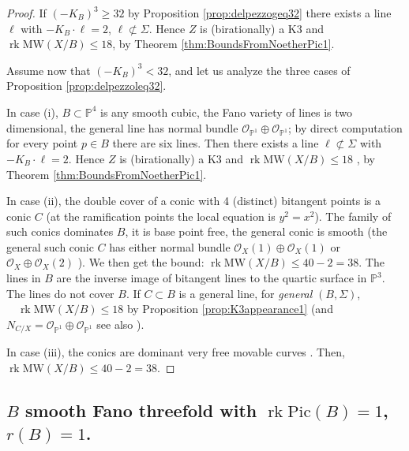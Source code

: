 \documentclass[11pt]{amsart}
\theoremstyle{definition}
\theoremstyle{definition}
\theoremstyle{remark}
\theoremstyle{remark}
\theoremstyle{definition}
\theoremstyle{conjecture}
\newcommand{\MW}{\mathrm{MW}}
\newcommand{\Pic}{\mathrm{Pic}}
\begin{document}
\begin{proof} If $ (-K_B)^3 \geq 32$ by Proposition \ref{prop:delpezzogeq32} there exists a line $\ell$ with $-K_B \cdot \ell =2$, $ \ell \not \subset \Sigma$. Hence $Z$  is (birationally) a K3  
 and $\operatorname{rk} \MW(X/B)   \leq {18}$, by Theorem \ref{thm:BoundsFromNoetherPic1}.

Assume now that   $(-K_B)^3 < 32$, and let us analyze the three cases of Proposition \ref{prop:delpezzoleq32}.

In case (i),
$B \subset \mathbb{P}^4$ is  any smooth cubic,  the Fano variety of lines is two dimensional, the general line has normal bundle $\mathcal{O}_{\mathbb{P}^1} \oplus\mathcal{O}_{\mathbb{P}^1}$;  by direct computation  for every point $p \in B$ there are six lines. Then there exists a line  $ \ell \not \subset \Sigma$ with $-K_B \cdot \ell =2$.  Hence %
$Z$  is (birationally) a K3  
 and $\operatorname{rk} \MW(X/B)   \leq {18}$ , by Theorem \ref{thm:BoundsFromNoetherPic1}.


  In case (ii), 
the double cover of a conic with 4 (distinct) bitangent points is a conic $C$ (at the ramification points the local equation is $y^2=x^2$).  The family of such conics dominates $B$, it is base point free,  the general conic is smooth  (the general such conic $C$ has either normal bundle $\mathcal{O}_X (1)\oplus \mathcal{O}_X(1)$  or $\mathcal{O}_X \oplus \mathcal{O}_X(2)$ \cite[Lemma 2.2]{MarkushevichTikhomirov}).  We then get the bound: $ \operatorname{rk} \MW(X/B)  \leq 40 - 2 =38. $
 The lines in $B$ are the inverse image of bitangent lines to the quartic surface in $\mathbb{P}^3$.  The lines do not cover $B$. If $C\subset B$ is a general line, for \textit{general} $(B, \Sigma)$,
$\quad  \operatorname{rk} \MW(X/B)  \leq18$ by 
Proposition \ref{prop:K3appearance1} (and $N_{C/X}= \mathcal{O}_{\mathbb{P}^1} \oplus \mathcal{O}_{\mathbb{P}^1} $ see also  \cite[Lemma 2.1]{MarkushevichTikhomirov}). 




In case (iii),  
the conics are dominant very free movable curves \cite[Proposition 3.2] {ShimizuTanimoto}. 
Then,
$\operatorname{rk} \MW(X/B)  \leq  40 -2 =38$.  \end{proof}




\vskip 0.4in

\subsection{$B$ smooth Fano threefold  with $\operatorname{rk} \Pic (B)=1$, $r(B)=1$.}~
\end{document}
